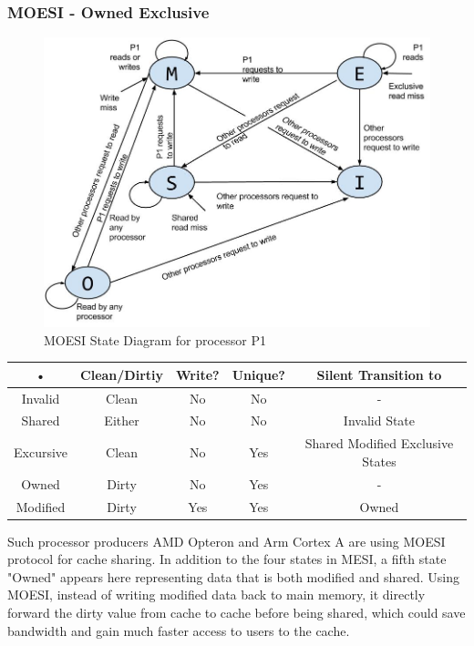 \documentclass[informationsecurity]{gucmasterproject}
\begin{document}
\subsubsection{MOESI - Owned Exclusive}
\begin{figure}[h!]
    \centering
    \includegraphics[width=1\textwidth]{MOESIstatediagram.jpg}
    \caption{MOESI State Diagram for processor P1}
    \label{fig:MOESIstatediagram}
\end{figure}

\begin{tabular}{|c|c|c|c|c|}
\hline 
• & Clean/Dirtiy & Write? & Unique? & Silent Transition to \\ 
\hline 
Invalid & Clean & No & No & - \\ 
\hline 
Shared & Either & No & No & Invalid State \\ 
\hline 
Excursive & Clean & No & Yes & Shared Modified Exclusive States \\ 
\hline 
Owned & Dirty & No & Yes & - \\ 
\hline 
Modified & Dirty & Yes & Yes & Owned \\ 
\hline 
\end{tabular} 

Such processor producers AMD Opteron and Arm Cortex A are using MOESI protocol for cache sharing. In addition to the four states in MESI, a fifth state "Owned" appears here representing data that is both modified and shared. Using MOESI, instead of writing modified data back to main memory, it directly forward the dirty value from cache to cache before being shared, which could save bandwidth and gain much faster access to users to the cache.
\end{document}
